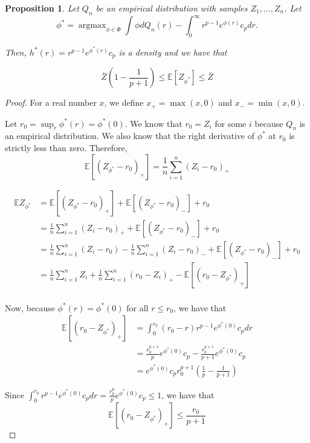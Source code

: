 \documentclass[12pt]{article}
\newtheorem{proposition}[theorem]{Proposition}
\DeclareMathOperator*{\argmax}{argmax}
\begin{document}
\begin{proposition}
  \label{Prop:MLEMeanPreservation}
Let $Q_n$ be an empirical distribution with samples $Z_1, ..., Z_n$. Let
\[
\phi^* = \argmax_{\phi \in \Phi} \int \phi dQ_n(r) - \int_0^\infty r^{p-1} e^{\phi(r)} c_p dr.
\]

Then, $h^*(r) = r^{p-1} e^{\phi^*(r)} c_p$ is a density and we have that

\[
\bar{Z} \left(1 - \frac{1}{p+1} \right) \leq \mathbb{E}[Z_{\phi^*}] \leq \bar{Z}
\]
\end{proposition}

\begin{proof}
For a real number $x$, we define $x_+ = \max(x, 0)$ and $x_- = \min(x, 0)$.

Let $r_0 = \sup_r \phi^*(r) = \phi^*(0)$. We know that $r_0 = Z_i$ for some $i$ because $Q_n$ is an empirical distribution. We also know that the right derivative of $\phi^*$ at $r_0$ is strictly less than zero. Therefore,
\[
\mathbb{E} [ (Z_{\phi^*} - r_0)_+ ] = \frac{1}{n} \sum_{i=1}^n (Z_i - r_0)_+
\]

\begin{align*}
\mathbb{E} Z_{\phi^*} &= \mathbb{E} [ (Z_{\phi^*} - r_0)_+ ] + \mathbb{E} [ (Z_{\phi^*} - r_0)_- ] + r_0 \\
     &= \frac{1}{n} \sum_{i=1}^n (Z_i - r_0)_+ +  \mathbb{E} [ (Z_{\phi^*} - r_0)_- ] + r_0 \\
     &= \frac{1}{n} \sum_{i=1}^n (Z_i - r_0) - \frac{1}{n} \sum_{i=1}^n (Z_i - r_0)_- + \mathbb{E} [ (Z_{\phi^*} - r_0)_- ] + r_0 \\
     &= \frac{1}{n} \sum_{i=1}^n Z_i + \frac{1}{n} \sum_{i=1}^n (r_0 - Z_i)_+ - \mathbb{E} [ (r_0 - Z_{\phi^*} )_+ ] \\    
\end{align*}

Now, because $\phi^*(r) = \phi^*(0)$ for all $r \leq r_0$, we have that
\begin{align*}
\mathbb{E} [ (r_0 - Z_{\phi^*})_+ ] &= \int_0^{r_0} (r_0 - r) r^{p-1} e^{\phi^*(0)} c_p dr \\
   &= \frac{r_0^{p+1}}{p} e^{\phi^*(0)} c_p - \frac{r_0^{p+1}}{p+1} e^{\phi^*(0)} c_p \\
   &= e^{\phi^*(0)} c_p r_0^{p+1} \left( \frac{1}{p} - \frac{1}{p+1} \right)
\end{align*}

Since $\int_0^{r_0} r^{p-1} e^{\phi^*(0)} c_p dr = \frac{r_0^p}{p} e^{\phi^*(0)} c_p \leq 1$, we have that
\[
\mathbb{E} [ (r_0 - Z_{\phi^*})_+ ] \leq \frac{r_0}{p+1} 
\]


\end{proof}
\end{document}
